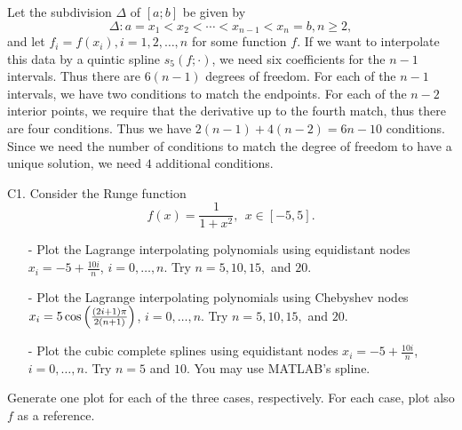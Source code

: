 \documentclass[12pt]{report}
\begin{document}
\begin{solution}

    \noindent
    Let the subdivision $\Delta$ of $[a; b]$ be given by
    \[
        \Delta : a = x_1 < x_2 < \cdots < x_{n-1} < x_n = b, n \geq 2,
    \]
    and let $f_i = f(x_i), i = 1,2,\dots,n$ for some function $f$. If we want to interpolate this data by a quintic spline $s_5(f;\cdot)$, we need six coefficients for the $n-1$ intervals. Thus there are $6(n-1)$ degrees of freedom. For each of the $n-1$ intervals, we have two conditions to match the endpoints. For each of the $n-2$ interior points, we require that the derivative up to the fourth match, thus there are four conditions. Thus we have $2(n-1) + 4(n-2) = 6n - 10$ conditions. Since we need the number of conditions to match the degree of freedom to have a unique solution, we need $4$ additional conditions. 
\end{solution}

\newpage



\begin{problem}
    C1. Consider the Runge function
    \[ 
        f(x) = \frac{1}{1 + x^2}, ~~ x\in[-5,5].
    \]
    \begin{enumerate}
        \item [-]
        Plot the Lagrange interpolating polynomials using equidistant nodes $x_i = -5 + \frac{10i}{n}$, $i= 0, \dots,n$. Try $n=5,10,15,$ and $20$. 
        
        \item [-]
        Plot the Lagrange interpolating polynomials using Chebyshev nodes $x_i = 5\cos{\left(\frac{(2i + 1)\pi}{2(n+1)}\right)}$, $i= 0, \dots,n$. Try $n=5,10,15,$ and $20$.
        
        \item [-]
        Plot the cubic complete splines using equidistant nodes $x_i = -5 + \frac{10i}{n}$, $i= 0, \dots,n$. Try $n=5$ and $10$. You may use MATLAB's spline.
        
    \end{enumerate}
    Generate one plot for each of the three cases, respectively. For each case, plot also $f$ as a reference.
\end{problem}
\end{document}
